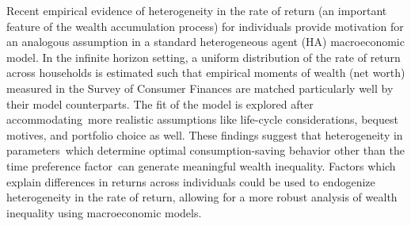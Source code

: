 Recent empirical evidence of heterogeneity in the rate of return (an important feature of the wealth accumulation process) for individuals provide motivation for an analogous assumption in a standard heterogeneous agent (HA) macroeconomic model. In the infinite horizon setting, a uniform distribution of the rate of return across households is estimated such that empirical moments of wealth (net worth) measured in the Survey of Consumer Finances are matched particularly well by their model counterparts. The fit of the model is explored after accommodating more realistic assumptions like life-cycle considerations, bequest motives, and portfolio choice as well. These findings suggest that heterogeneity in parameters which determine optimal consumption-saving behavior other than the time preference factor can generate meaningful wealth inequality. Factors which explain differences in returns across individuals could be used to endogenize heterogeneity in the rate of return, allowing for a more robust analysis of wealth inequality using macroeconomic models.